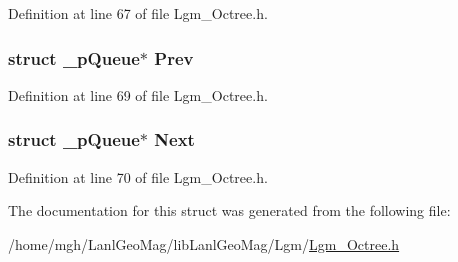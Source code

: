 Definition at line 67 of file Lgm\_\-Octree.h.\hypertarget{struct__p_queue_4717220aafe87eeda3986b3a258a2a2a}{
\subsubsection[{Prev}]{\setlength{\rightskip}{0pt plus 5cm}struct {\bf \_\-pQueue}$\ast$ {\bf Prev}}}
\label{struct__p_queue_4717220aafe87eeda3986b3a258a2a2a}




Definition at line 69 of file Lgm\_\-Octree.h.\hypertarget{struct__p_queue_3a316f1387f6ede290905c4d79962b17}{
\subsubsection[{Next}]{\setlength{\rightskip}{0pt plus 5cm}struct {\bf \_\-pQueue}$\ast$ {\bf Next}}}
\label{struct__p_queue_3a316f1387f6ede290905c4d79962b17}




Definition at line 70 of file Lgm\_\-Octree.h.

The documentation for this struct was generated from the following file:\begin{CompactItemize}
\item 
/home/mgh/LanlGeoMag/libLanlGeoMag/Lgm/\hyperlink{_lgm___octree_8h}{Lgm\_\-Octree.h}\end{CompactItemize}
